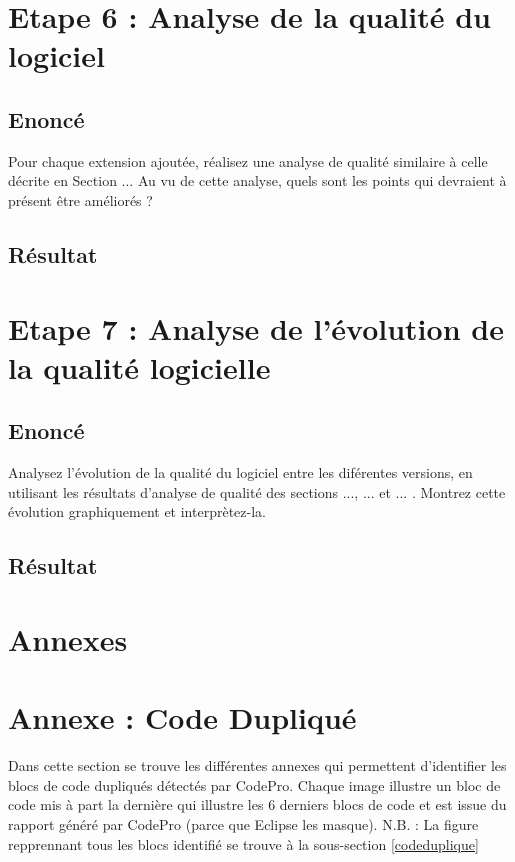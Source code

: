 \documentclass[12pt,a4paper,final]{article}
\begin{document}
\newpage
\section{Etape 6 : Analyse de la qualité du logiciel}\label{sec:etape6}
\subsection{Enoncé} 
Pour chaque extension ajoutée, réalisez une analyse de qualité similaire à celle décrite en Section ... Au vu de cette analyse, quels sont les points qui devraient à présent être améliorés ?
\subsection{Résultat}



\newpage
\section{Etape 7 : Analyse de l'évolution de la qualité logicielle}\label{sec:etape7}
\subsection{Enoncé} 
Analysez l'évolution de la qualité du logiciel entre les diférentes versions, en utilisant les résultats d'analyse de qualité des sections ..., ... et ... . Montrez cette évolution graphiquement et interprètez-la.
\subsection{Résultat}

\clearpage
\newpage
\section{Annexes} \label{sec:annexe}
\appendix %
\section{Annexe : Code Dupliqué}\label{SimilarCode}
Dans cette section se trouve les différentes annexes qui permettent d'identifier les blocs de code dupliqués détectés par CodePro. Chaque image illustre un bloc de code mis à part la dernière qui illustre les 6 derniers blocs de code et est issue du rapport généré par CodePro (parce que Eclipse les masque).
N.B. : La figure repprennant tous les blocs identifié se trouve à la sous-section \ref{codeduplique}
\end{document}
